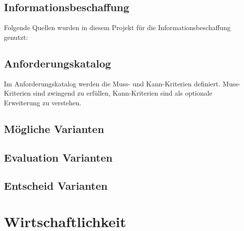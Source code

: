 \subsection{Informationsbeschaffung}

Folgende Quellen wurden in diesem Projekt für die Informationsbeschaffung
genutzt:



\clearpage
\subsection{Anforderungskatalog}

Im Anforderungskatalog werden die Muss- und Kann-Kriterien definiert.
Muss-Kriterien sind zwingend zu erfüllen, Kann-Kriterien sind als optionale
Erweiterung zu verstehen.



\subsection{Mögliche Varianten}

\subsection{Evaluation Varianten}

\subsection{Entscheid Varianten}

\clearpage
\section{Wirtschaftlichkeit}


